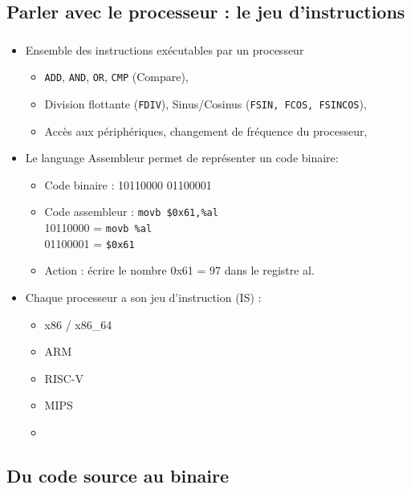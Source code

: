 \subsection{Parler avec le processeur : le jeu d'instructions}

\begin{frame}[fragile]
\frametitle{\insertsubsection}
\begin{itemize}
  \item Ensemble des instructions exécutables par un processeur
    \begin{itemize}
    \item \texttt{ADD}, \texttt{AND}, \texttt{OR}, \texttt{CMP} (Compare),\…
     \item Division flottante (\texttt{FDIV}), Sinus/Cosinus (\texttt{FSIN, FCOS, FSINCOS}),\…
     \item Accès aux périphériques, changement de fréquence du processeur,\…
    \end{itemize}
  \item Le language Assembleur permet de représenter un code binaire:
    \begin{itemize}
      \item Code binaire : 10110000 01100001
      \item Code assembleur : \texttt{movb \$0x61,\%al}\\
            10110000 = \texttt{movb \%al}\\
            01100001 = \texttt{\$0x61}
      \item Action : écrire le nombre 0x61 = 97 dans le registre al.
    \end{itemize}
  \item Chaque processeur a son jeu d'instruction (IS) : 
    \begin{itemize}
      \item x86 / x86\_64
      \item ARM
      \item RISC-V
      \item MIPS
      \item \…
    \end{itemize}
\end{itemize}
\end{frame}

\subsection{Du code source au binaire}

